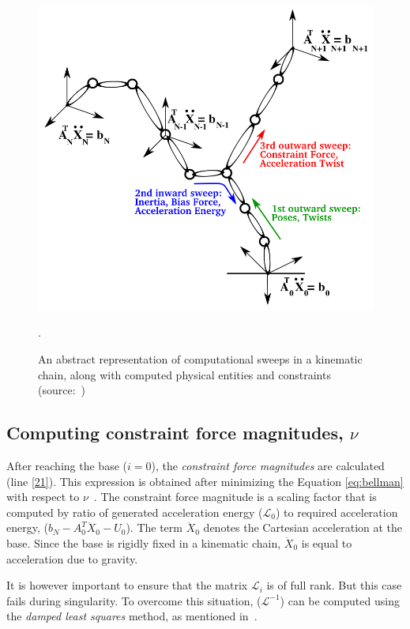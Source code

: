 \begin{figure}[h!]
	\label{fig:sweep}
	\centering
	\includegraphics[scale=0.35]{images/sweep.png}
	\caption{An abstract representation of computational sweeps in a kinematic chain, along with computed physical entities and constraints (source:~\cite{shakhimardanov2015composable})}.	
\end{figure}

\subsection{Computing constraint force magnitudes, $\nu$} \label{sec:computing-constraints}

After reaching the base ($i = 0$), the \textit{constraint force magnitudes} are calculated (line \ref{21}). This expression is obtained after minimizing the Equation \ref{eq:bellman} with respect to $\nu$~\cite{shakhimardanov2015composable}. The constraint force magnitude is a scaling factor that is computed by ratio of generated acceleration energy ($\mathcal{L}_0$) to required acceleration energy, ($b_N -  A_0^T \ddot{X}_0 - U_0 $). The term $\ddot{X}_0$ denotes the Cartesian acceleration at the base. Since the base is rigidly fixed in a kinematic chain, $\ddot{X}_0$ is equal to acceleration due to gravity. 

It is however important to ensure that the matrix $\mathcal{L}_i$ is of full rank. But this case fails during singularity. To overcome this situation, ($\mathcal{L}^{-1}$) can be computed using the \textit{damped least squares} method, as mentioned in~\cite{shakhimardanov2015composable}.

